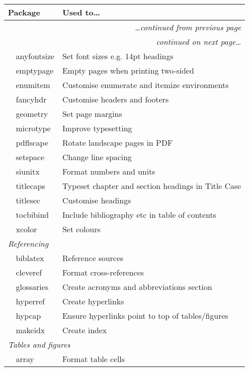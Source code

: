 
\begin{longtable}{l >{\ttfamily}l l}
    \toprule
    \multicolumn{2}{l}{\textnormal{Package}} & Used to\dots\\
    \midrule
    \endfirsthead
    \multicolumn{3}{r}{\small\textit{\dots continued from previous page}}\\
    \midrule
    \endhead
    \midrule
    \multicolumn{3}{r}{\small\textit{continued on next page\dots}}
    \endfoot
    \endlastfoot
    \multicolumn{3}{l}{\textit{Typesetting}}\\
    & anyfontsize & Set font sizes e.g. 14pt headings\\
    & emptypage & Empty pages when printing two-sided\\
    & enumitem & Customise enumerate and itemize environments\\
    & fancyhdr & Customise headers and footers\\
    & geometry & Set page margins\\
    & microtype & Improve typesetting\\
    & pdflscape & Rotate landscape pages in PDF\\
    & setspace & Change line spacing\\
    & siunitx & Format numbers and units\\
    & titlecaps & Typeset chapter and section headings in Title Case\\
    & titlesec & Customise headings\\
    & tocbibind & Include bibliography etc in table of contents\\
    & xcolor & Set colours\\
    \multicolumn{3}{l}{\textit{Referencing}}\\
    & biblatex & Reference sources\\
    & cleveref & Format cross-references\\
    & glossaries & Create acronyms and abbreviations section\\
    & hyperref & Create hyperlinks\\
    & hypcap & Ensure hyperlinks point to top of tables/figures\\
    & makeidx & Create index\\
    \multicolumn{3}{l}{\textit{Tables and figures}}\\
    & array & Format table cells\\

\end{longtable}
